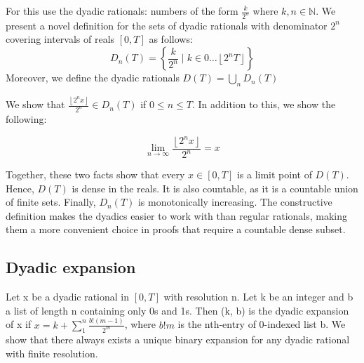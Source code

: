 
For this use the dyadic rationals: numbers of the form \(\frac{k}{2^n}\) where \(k, n\in\mathbb{N}\). We present a novel definition for the sets of dyadic rationals with denominator \(2^n\) covering intervals of reals \([0,T]\) as follows:
 \[D_n(T) = \left\{\frac{k}{2^n} \mid k \in 0 \ldots\left\lfloor 2^nT \right\rfloor\right\}\]
 Moreover, we define the dyadic rationals \(D(T)= \bigcup_n D_n(T)\)

We show that \(\frac{\left\lfloor 2^nx \right\rfloor}{2^n} \in  D_n(T)\) if \(0 \le n \le T\). In addition to this, we show the following:
 \begin{lemma}
 \[\lim_{n\to\infty}\frac{\left\lfloor 2^nx \right\rfloor}{2^n} = x\]
 \end{lemma}

Together, these two facts show that every \(x \in [0,T]\) is a limit point of \(D(T)\). Hence, \(D(T)\) is dense in the reals. It is also countable, as it is a countable union of finite sets. Finally, \(D_n(T)\) is monotonically increasing. The constructive definition makes the dyadics easier to work with than regular rationals, making them a more convenient choice in proofs that require a countable dense subset.

\subsection{Dyadic expansion}
Let x be a dyadic rational in \([0,T]\) with resolution n. Let k be an integer and b a list of length n containing only 0s and 1s. Then (k, b) is the dyadic expansion of x if \(x = k + \sum_1^n \frac{b ! (m-1)}{2 ^ m}\), where \(b!m\) is the nth-entry of 0-indexed list b. We show that there always exists a unique binary expansion for any dyadic rational with finite resolution.

